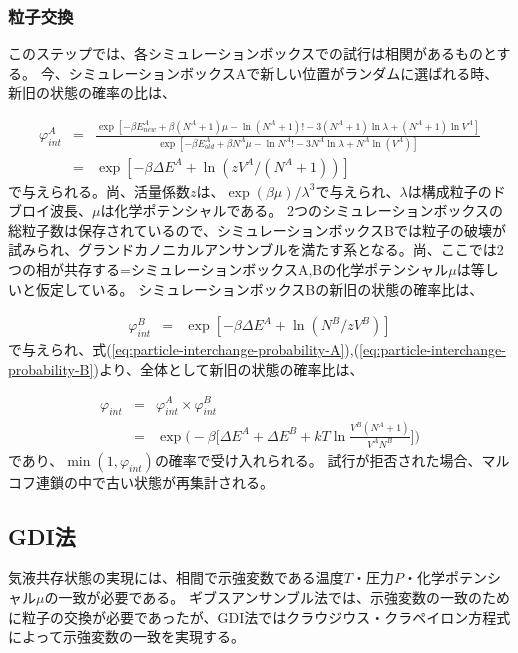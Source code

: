 \documentclass[titlepage]{jsreport}
\begin{document}
\subsubsection{粒子交換}\label{principle-subsubsec:particle-interchange}
このステップでは、各シミュレーションボックスでの試行は相関があるものとする。
今、シミュレーションボックスAで新しい位置がランダムに選ばれる時、新旧の状態の確率の比は、

\large
\begin{eqnarray}
\varphi_{int}^A &=& \frac{\exp[-{\beta}E^A_{new}+\beta(N^A+1)\mu-\ln(N^A+1)!-3(N^A+1)\ln\lambda+(N^A+1)\ln{V^A}]}{\exp[-{\beta}E^A_{old}+{\beta}N^A{\mu}-\ln{N^A!}-3N^A\ln{\lambda}+N^A\ln(V^A)]}  \nonumber\\
                &=& \exp[-{\beta}{\Delta}E^A+\ln(zV^A/(N^A+1))]\label{eq:particle-interchange-probability-A}
\end{eqnarray}
\normalsize
で与えられる。尚、活量係数$z$は、$\exp(\beta\mu)/\lambda^3$で与えられ、$\lambda$は構成粒子のドブロイ波長、$\mu$は化学ポテンシャルである。
2つのシミュレーションボックスの総粒子数は保存されているので、シミュレーションボックスBでは粒子の破壊が試みられ、グランドカノニカルアンサンブルを満たす系となる。尚、ここでは2つの相が共存する=シミュレーションボックスA,Bの化学ポテンシャル$\mu$は等しいと仮定している。
シミュレーションボックスBの新旧の状態の確率比は、

\large
\begin{eqnarray}
\varphi_{int}^B &=& \exp[-{\beta}{\Delta}E^A+\ln(N^B/zV^B)]\label{eq:particle-interchange-probability-B}
\end{eqnarray}
\normalsize
で与えられ、式(\ref{eq:particle-interchange-probability-A}),(\ref{eq:particle-interchange-probability-B})より、全体として新旧の状態の確率比は、

\large
\begin{eqnarray}
\varphi_{int} &=& \varphi_{int}^A×\varphi_{int}^B \nonumber\\
              &=& \exp\Bigg(-\beta\bigg[{\Delta}E^A+{\Delta}E^B+{kT}\ln{\frac{V^B(N^A+1)}{V^AN^B}}\bigg]\Bigg)\label{eq:particle-interchange-probability-all}
\end{eqnarray}
\normalsize
であり、$\min(1, \varphi_{int})$の確率で受け入れられる。
試行が拒否された場合、マルコフ連鎖の中で古い状態が再集計される。


\subsection{GDI法}\label{principle-subsec:gibbs-duhem-integration}
気液共存状態の実現には、相間で示強変数である温度$T$・圧力$P$・化学ポテンシャル$\mu$の一致が必要である。
ギブスアンサンブル法では、示強変数の一致のために粒子の交換が必要であったが、GDI法ではクラウジウス・クラペイロン方程式によって示強変数の一致を実現する。
\end{document}
